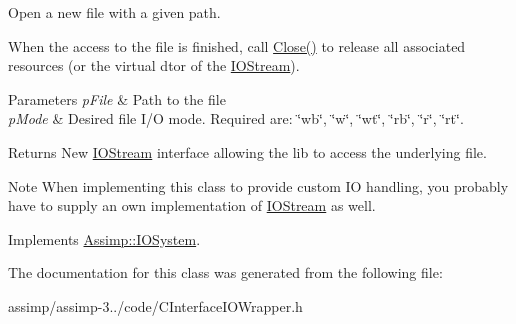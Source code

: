 Open a new file with a given path. 

When the access to the file is finished, call \hyperlink{class_assimp_1_1_c_i_o_system_wrapper_a6aa99720fd1e7fbeb637b8e06c48ef83}{Close()} to release all associated resources (or the virtual dtor of the \hyperlink{class_assimp_1_1_i_o_stream}{I\+O\+Stream}).


\begin{DoxyParams}{Parameters}
{\em p\+File} & Path to the file \\
\hline
{\em p\+Mode} & Desired file I/\+O mode. Required are\+: \char`\"{}wb\char`\"{}, \char`\"{}w\char`\"{}, \char`\"{}wt\char`\"{}, \char`\"{}rb\char`\"{}, \char`\"{}r\char`\"{}, \char`\"{}rt\char`\"{}.\\
\hline
\end{DoxyParams}
\begin{DoxyReturn}{Returns}
New \hyperlink{class_assimp_1_1_i_o_stream}{I\+O\+Stream} interface allowing the lib to access the underlying file. 
\end{DoxyReturn}
\begin{DoxyNote}{Note}
When implementing this class to provide custom I\+O handling, you probably have to supply an own implementation of \hyperlink{class_assimp_1_1_i_o_stream}{I\+O\+Stream} as well. 
\end{DoxyNote}


Implements \hyperlink{class_assimp_1_1_i_o_system_ac512ece3b0701de5682553007a4c0816}{Assimp\+::\+I\+O\+System}.



The documentation for this class was generated from the following file\+:\begin{DoxyCompactItemize}
\item 
assimp/assimp-\/3../code/C\+Interface\+I\+O\+Wrapper.\+h\end{DoxyCompactItemize}
